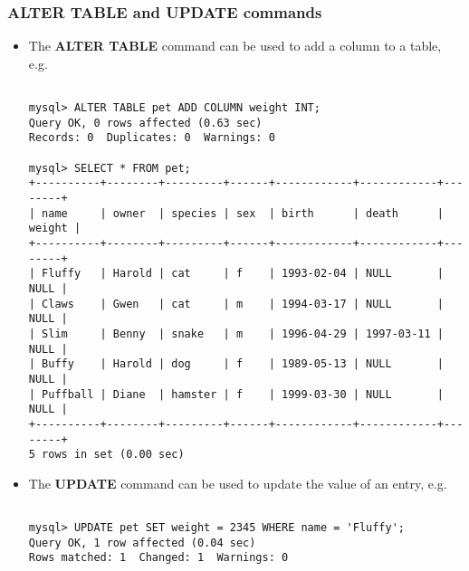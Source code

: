 \documentclass[hyperref={pdfpagelabels=false},svgnames,xcolor=table]{beamer}
\begin{document}
\begin{frame}[shrink=10,fragile]
  \frametitle{ALTER TABLE and UPDATE commands}
  \begin{itemize}
    \item The \textbf{ALTER TABLE} command can be used to add a
      column to a table, e.g.\
\begin{scriptsize}
\begin{verbatim}

mysql> ALTER TABLE pet ADD COLUMN weight INT;
Query OK, 0 rows affected (0.63 sec)
Records: 0  Duplicates: 0  Warnings: 0

mysql> SELECT * FROM pet;
+----------+--------+---------+------+------------+------------+--------+
| name     | owner  | species | sex  | birth      | death      | weight |
+----------+--------+---------+------+------------+------------+--------+
| Fluffy   | Harold | cat     | f    | 1993-02-04 | NULL       |   NULL |
| Claws    | Gwen   | cat     | m    | 1994-03-17 | NULL       |   NULL |
| Slim     | Benny  | snake   | m    | 1996-04-29 | 1997-03-11 |   NULL |
| Buffy    | Harold | dog     | f    | 1989-05-13 | NULL       |   NULL |
| Puffball | Diane  | hamster | f    | 1999-03-30 | NULL       |   NULL |
+----------+--------+---------+------+------------+------------+--------+
5 rows in set (0.00 sec)

\end{verbatim}
\end{scriptsize}
    \item The \textbf{UPDATE} command can be used to update the value of
      an entry, e.g.\
\begin{scriptsize}
\begin{verbatim}

mysql> UPDATE pet SET weight = 2345 WHERE name = 'Fluffy';
Query OK, 1 row affected (0.04 sec)
Rows matched: 1  Changed: 1  Warnings: 0
\end{verbatim}
\end{scriptsize}
  \end{itemize}
\end{frame}
\end{document}
